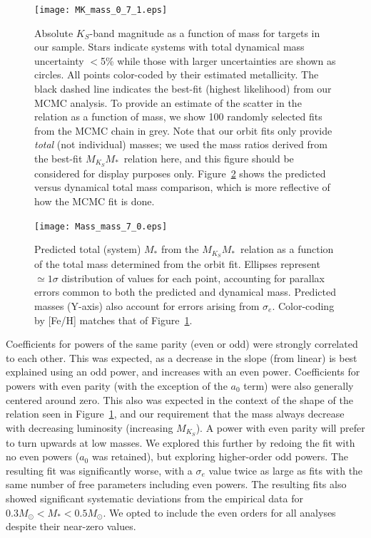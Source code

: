 \documentclass[twocolumn]{aastex62}
\newcommand{\mks}{$M_{K_S}$}
\newcommand{\mmk}{$M_{K_S}$\textendash$M_*$}
\begin{document}
\begin{figure}[htp]
\begin{center}
\texttt{[image: MK\_mass\_0\_7\_1.eps]}
\caption{Absolute $K_S$-band magnitude as a function of mass for targets in our sample. Stars indicate systems with total dynamical mass uncertainty $<$5\% while those with larger uncertainties are shown as circles. All points color-coded by their estimated metallicity. The black dashed line indicates the best-fit (highest likelihood) from our MCMC analysis. To provide an estimate of the scatter in the relation as a function of mass, we show 100 randomly selected fits from the MCMC chain in grey. Note that our orbit fits only provide {\it total} (not individual) masses; we used the mass ratios derived from the best-fit \mmk\ relation here, and this figure should be considered for display purposes only. Figure~\ref{fig:m_m} shows the predicted versus dynamical total mass comparison, which is more reflective of how the MCMC fit is done. }
\label{fig:relation}
\end{center}
\end{figure}

\begin{figure}[ht]
\begin{center}
\texttt{[image: Mass\_mass\_7\_0.eps]}
\caption{Predicted total (system) $M_*$ from the \mmk\ relation as a function of the total mass determined from the orbit fit. Ellipses represent $\simeq1\sigma$ distribution of values for each point, accounting for parallax errors common to both the predicted and dynamical mass. Predicted masses (Y-axis) also account for errors arising from $\sigma_e$. Color-coding by [Fe/H] matches that of Figure~\ref{fig:relation}.}
\label{fig:m_m}
\end{center}
\end{figure}


Coefficients for powers of the same parity (even or odd) were strongly correlated to each other. This was expected, as a decrease in the slope (from linear) is best explained using an odd power, and increases with an even power. Coefficients for powers with even parity (with the exception of the $a_0$ term) were also generally centered around zero. This also was expected in the context of the shape of the relation seen in Figure~\ref{fig:relation}, and our requirement that the mass always decrease with decreasing luminosity (increasing \mks). A power with even parity will prefer to turn upwards at low masses. We explored this further by redoing the fit with no even powers ($a_0$ was retained), but exploring higher-order odd powers. The resulting fit was significantly worse, with a $\sigma_e$ value twice as large as fits with the same number of free parameters including even powers. The resulting fits also showed significant systematic deviations from the empirical data for $0.3M_\odot<M_*<0.5M_\odot$. We opted to include the even orders for all analyses despite their near-zero values. 
\end{document}
